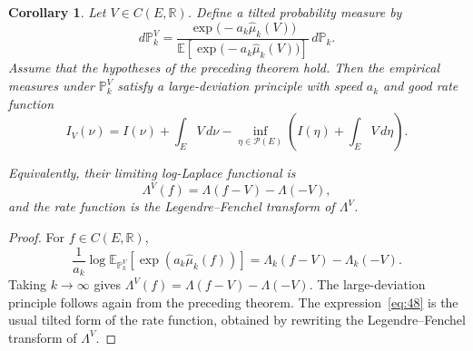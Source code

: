 \documentclass[12pt,a4paper,reqno]{article}
\theoremstyle{thmstyleone}
\newtheorem{corollary}[theorem]{Corollary}
\theoremstyle{thmstylethree}
\theoremstyle{thmstyletwo}
\newtheorem{remark}[theorem]{Remark}
\numberwithin{equation}{subsection}
\begin{document}
\begin{corollary}\label{cor:dev-transfer}
Let $V\in C(E,\mathbb R)$. Define a tilted probability measure by
\[
d\mathbb P_k^V
=
\frac{
\exp\bigl(-a_k\widehat\mu_k(V)\bigr)
}{
\mathbb E\left[\exp\bigl(-a_k\widehat\mu_k(V)\bigr)\right]
}
\,d\mathbb P_k.
\]
Assume that the hypotheses of the preceding theorem hold. Then the empirical measures under $\mathbb P_k^V$ satisfy a large-deviation principle with speed $a_k$ and good rate function
\begin{equation}\label{eq:48}
I_V(\nu)
=
I(\nu)+\int_E V\,d\nu
-
\inf_{\eta\in\mathcal P(E)}
\left(
I(\eta)+\int_E V\,d\eta
\right).
\end{equation}

Equivalently, their limiting log-Laplace functional is
\[
\Lambda^V(f)
=
\Lambda(f-V)-\Lambda(-V),
\]
and the rate function is the Legendre--Fenchel transform of $\Lambda^V$.
\end{corollary}

\begin{proof}
For $f\in C(E,\mathbb R)$,
\[
\frac{1}{a_k}
\log
\mathbb E_{\mathbb P_k^V}
\left[
\exp\left(a_k\widehat\mu_k(f)\right)
\right]
=
\Lambda_k(f-V)-\Lambda_k(-V).
\]
Taking $k\to\infty$ gives $\Lambda^V(f)=\Lambda(f-V)-\Lambda(-V)$. The large-deviation principle follows again from the preceding theorem. The expression~\eqref{eq:48} is the usual tilted form of the rate function, obtained by rewriting the Legendre--Fenchel transform of $\Lambda^V$.
\end{proof}

\end{document}
